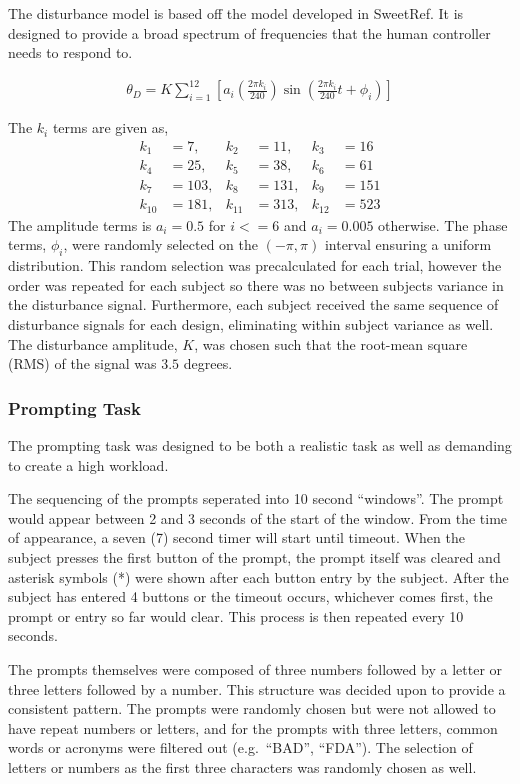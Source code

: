The disturbance model is based off the model developed in SweetRef.
It is designed to provide a broad spectrum of frequencies that the human controller needs to respond to.

\begin{align}
    \theta_D = K\sum\limits_{i=1}^{12} \left[ a_i \left(\frac{2\pi k_i}{240} \right) \sin\left( \frac{2\pi k_i}{240}t + \phi_i \right) \right]
\end{align}

The $k_i$ terms are given as,
\begin{align*}
    k_1 &= 7, & k_2 &= 11, & k_3 &= 16 \\
    k_4 &= 25, & k_5 &= 38, & k_6 &= 61 \\
    k_7 &= 103, & k_8 &= 131, & k_9 &= 151 \\
    k_{10} &= 181, & k_{11} &= 313, & k_{12} &= 523
\end{align*}
The amplitude terms is $a_i=0.5$ for $i <= 6$ and $a_i=0.005$ otherwise.
The phase terms, $\phi_i$, were randomly selected on the $(-\pi, \pi)$ interval ensuring a uniform distribution.
This random selection was precalculated for each trial, however the order was repeated for each subject so there was no between subjects variance in the disturbance signal.
Furthermore, each subject received the same sequence of disturbance signals for each design, eliminating within subject variance as well.
The disturbance amplitude, $K$, was chosen such that the root-mean square (RMS) of the signal was $3.5$ degrees.

\subsubsection{Prompting Task}

The prompting task was designed to be both a realistic task as well as demanding to create a high workload.

The sequencing of the prompts seperated into 10 second ``windows''.
The prompt would appear between 2 and 3 seconds of the start of the window.
From the time of appearance, a seven (7) second timer will start until timeout.
When the subject presses the first button of the prompt, the prompt itself was cleared and asterisk symbols (*) were shown after each button entry by the subject.
After the subject has entered 4 buttons or the timeout occurs, whichever comes first, the prompt or entry so far would clear.
This process is then repeated every 10 seconds.

The prompts themselves were composed of three numbers followed by a letter or three letters followed by a number.
This structure was decided upon to provide a consistent pattern.
The prompts were randomly chosen but were not allowed to have repeat numbers or letters, and for the prompts with three letters, common words or acronyms were filtered out (e.g.\ ``BAD'', ``FDA'').
The selection of letters or numbers as the first three characters was randomly chosen as well.


